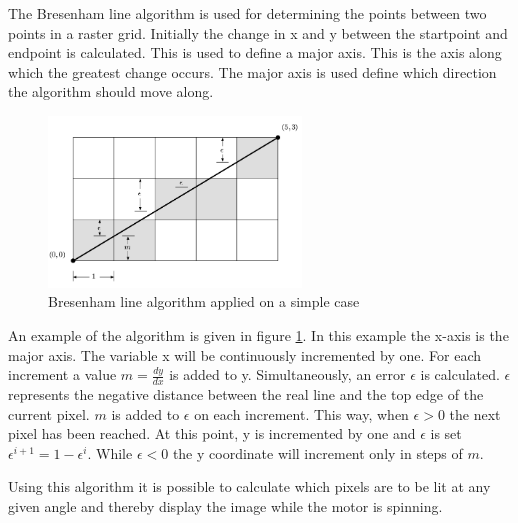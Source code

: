 The Bresenham line algorithm is used for determining the points between two points in a raster grid.
Initially the change in x and y between the startpoint and endpoint is calculated.
This is used to define a major axis.
This is the axis along which the greatest change occurs.
The major axis is used define which direction the algorithm should move along. 

\begin{figure}[H]
\center
\includegraphics[width = 0.6\textwidth]{images/bresenham}
\caption{Bresenham line algorithm applied on a simple case}
\label{fig:bresenham_line}
\end{figure}

An example of the algorithm is given in figure \ref{fig:bresenham_line}.
In this example the x-axis is the major axis.
The variable x will be continuously incremented by one.
For each increment a value $m = \frac{dy}{dx}$ is added to y.
Simultaneously, an error $\epsilon$ is calculated.
$\epsilon$ represents the negative distance between the real line and the top edge of the current pixel.
$m$ is added to $\epsilon$ on each increment.
This way, when $\epsilon>0$ the next pixel has been reached.
At this point, y is incremented by one and $\epsilon$ is set $\epsilon^{i+1}=1-\epsilon^i$.
While $\epsilon<0$ the y coordinate will increment only in steps of $m$.

Using this algorithm it is possible to calculate which pixels are to be lit at any given angle and thereby display the image while the motor is spinning.